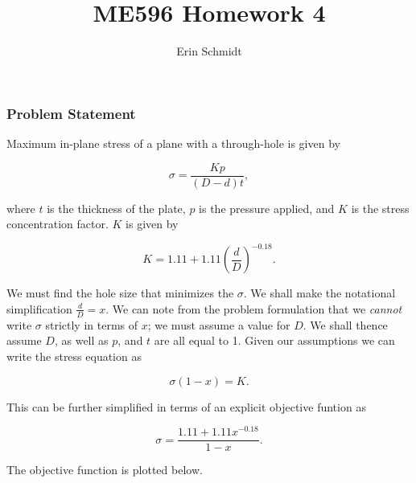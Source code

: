 \documentclass{article}
\title{ME596 Homework 4}
\date{}
\author{Erin Schmidt}
\begin{document}
    
    
    \maketitle
    
    

    
    \subsubsection*{Problem Statement}\label{problem-statement}

Maximum in-plane stress of a plane with a through-hole is given by

\[ \sigma = \frac{Kp}{(D-d)t},\]

where $t$ is the thickness of the plate, $p$ is the pressure applied,
and $K$ is the stress concentration factor. $K$ is given by

\[K = 1.11 +1.11\left(\frac{d}{D} \right)^{-0.18}.\]

We must find the hole size that minimizes the $\sigma$. We shall make
the notational simplification $\frac{d}{D} = x.$ We can note from the
problem formulation that we \emph{cannot} write $\sigma$ strictly in
terms of $x$; we must assume a value for $D$. We shall thence assume
$D$, as well as $p$, and $t$ are all equal to 1. Given our assumptions
we can write the stress equation as

\[\sigma (1 - x) = K.\]

This can be further simplified in terms of an explicit objective funtion
as

\[\sigma = \frac{1.11 + 1.11 x^{-0.18}}{1 - x}.\]

The objective function is plotted below.
\end{document}
